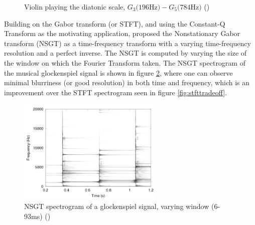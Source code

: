 \documentclass[report.tex]{subfiles}
\begin{document}
\begin{figure}[ht]
	\centering
	\hspace{0.5em}
	\caption{Violin playing the diatonic scale, $G_{3} \text{(196Hz)} - G_{5} \text{(784Hz)}$ (\cite[430]{jbrown})}
	\label{fig:violin}
\end{figure}

Building on the Gabor transform (or STFT), and using the Constant-Q Transform as the motivating application, \textcite{balazs} proposed the Nonstationary Gabor transform (NSGT) as a time-frequency transform with a varying time-frequency resolution and a perfect inverse. The NSGT is computed by varying the size of the window on which the Fourier Transform taken. The NSGT spectrogram of the musical glockenspiel signal is shown in figure \ref{fig:nsgttradeoff}, where one can observe minimal blurriness (or good resolution) in both time and frequency, which is an improvement over the STFT spectrogram seen in figure \ref{fig:stfttradeoff}.

\begin{figure}[ht]
	\centering
	\includegraphics[height=5cm]{./images-tftheory/tf_tradeoff_balasz3.png}
	\caption{NSGT spectrogram of a glockenspiel signal, varying window (6-93ms) (\cite[4]{jaillet})}
	\label{fig:nsgttradeoff}
\end{figure}
\end{document}
